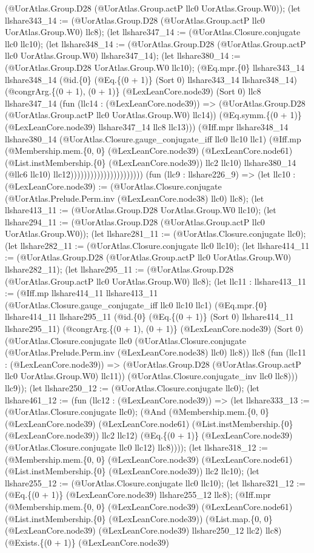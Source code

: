 \documentclass[11pt]{article}
\begin{document}
(@UorAtlas.Group.D28 (@UorAtlas.Group.actP llc0 UorAtlas.Group.W0)); (let llshare343\_14 := (@UorAtlas.Group.D28 (@UorAtlas.Group.actP llc0 UorAtlas.Group.W0) llc8); (let llshare347\_14 := (@UorAtlas.Closure.conjugate llc0 llc10); (let llshare348\_14 := (@UorAtlas.Group.D28 (@UorAtlas.Group.actP llc0 UorAtlas.Group.W0) llshare347\_14); (let llshare380\_14 := (@UorAtlas.Group.D28 UorAtlas.Group.W0 llc10); (@Eq.mpr.\{0\} llshare343\_14 llshare348\_14 (@id.\{0\} (@Eq.\{(0 + 1)\} (Sort 0) llshare343\_14 llshare348\_14) (@congrArg.\{(0 + 1), (0 + 1)\} (@LexLeanCore.node39) (Sort 0) llc8 llshare347\_14 (fun (llc14 : (@LexLeanCore.node39)) => (@UorAtlas.Group.D28 (@UorAtlas.Group.actP llc0 UorAtlas.Group.W0) llc14)) (@Eq.symm.\{(0 + 1)\} (@LexLeanCore.node39) llshare347\_14 llc8 llc13))) (@Iff.mpr llshare348\_14 llshare380\_14 (@UorAtlas.Closure.gauge\_conjugate\_iff llc0 llc10 llc1) (@Iff.mp (@Membership.mem.\{0, 0\} (@LexLeanCore.node39) (@LexLeanCore.node61) (@List.instMembership.\{0\} (@LexLeanCore.node39)) llc2 llc10) llshare380\_14 (@llc6 llc10) llc12)))))))))))))))))))))) (fun (llc9 : llshare226\_9) => (let llc10 : (@LexLeanCore.node39) := (@UorAtlas.Closure.conjugate (@UorAtlas.Prelude.Perm.inv (@LexLeanCore.node38) llc0) llc8); (let llshare413\_11 := (@UorAtlas.Group.D28 UorAtlas.Group.W0 llc10); (let llshare294\_11 := (@UorAtlas.Group.D28 (@UorAtlas.Group.actP llc0 UorAtlas.Group.W0)); (let llshare281\_11 := (@UorAtlas.Closure.conjugate llc0); (let llshare282\_11 := (@UorAtlas.Closure.conjugate llc0 llc10); (let llshare414\_11 := (@UorAtlas.Group.D28 (@UorAtlas.Group.actP llc0 UorAtlas.Group.W0) llshare282\_11); (let llshare295\_11 := (@UorAtlas.Group.D28 (@UorAtlas.Group.actP llc0 UorAtlas.Group.W0) llc8); (let llc11 : llshare413\_11 := (@Iff.mp llshare414\_11 llshare413\_11 (@UorAtlas.Closure.gauge\_conjugate\_iff llc0 llc10 llc1) (@Eq.mpr.\{0\} llshare414\_11 llshare295\_11 (@id.\{0\} (@Eq.\{(0 + 1)\} (Sort 0) llshare414\_11 llshare295\_11) (@congrArg.\{(0 + 1), (0 + 1)\} (@LexLeanCore.node39) (Sort 0) (@UorAtlas.Closure.conjugate llc0 (@UorAtlas.Closure.conjugate (@UorAtlas.Prelude.Perm.inv (@LexLeanCore.node38) llc0) llc8)) llc8 (fun (llc11 : (@LexLeanCore.node39)) => (@UorAtlas.Group.D28 (@UorAtlas.Group.actP llc0 UorAtlas.Group.W0) llc11)) (@UorAtlas.Closure.conjugate\_inv llc0 llc8))) llc9)); (let llshare250\_12 := (@UorAtlas.Closure.conjugate llc0); (let llshare461\_12 := (fun (llc12 : (@LexLeanCore.node39)) => (let llshare333\_13 := (@UorAtlas.Closure.conjugate llc0); (@And (@Membership.mem.\{0, 0\} (@LexLeanCore.node39) (@LexLeanCore.node61) (@List.instMembership.\{0\} (@LexLeanCore.node39)) llc2 llc12) (@Eq.\{(0 + 1)\} (@LexLeanCore.node39) (@UorAtlas.Closure.conjugate llc0 llc12) llc8)))); (let llshare318\_12 := (@Membership.mem.\{0, 0\} (@LexLeanCore.node39) (@LexLeanCore.node61) (@List.instMembership.\{0\} (@LexLeanCore.node39)) llc2 llc10); (let llshare255\_12 := (@UorAtlas.Closure.conjugate llc0 llc10); (let llshare321\_12 := (@Eq.\{(0 + 1)\} (@LexLeanCore.node39) llshare255\_12 llc8); (@Iff.mpr (@Membership.mem.\{0, 0\} (@LexLeanCore.node39) (@LexLeanCore.node61) (@List.instMembership.\{0\} (@LexLeanCore.node39)) (@List.map.\{0, 0\} (@LexLeanCore.node39) (@LexLeanCore.node39) llshare250\_12 llc2) llc8) (@Exists.\{(0 + 1)\} (@LexLeanCore.node39) 
\end{document}
